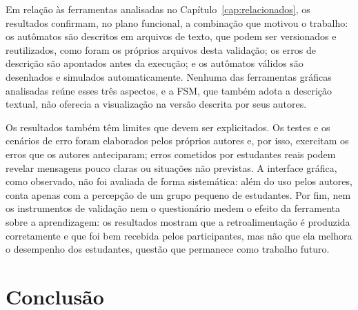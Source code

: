 \documentclass[
    12pt
    ,oneside
    ,a4paper
    ,chapter=TITLE
    ,section=TITLE
    ,sumario=abnt-6027-2012]{abntex2}
\begin{document}
Em relação às ferramentas analisadas no Capítulo~\ref{cap:relacionados}, os resultados
confirmam, no plano funcional, a combinação que motivou o trabalho: os autômatos são
descritos em arquivos de texto, que podem ser versionados e reutilizados, como foram os
próprios arquivos desta validação; os erros de descrição são apontados antes da execução; e
os autômatos válidos são desenhados e simulados automaticamente. Nenhuma das ferramentas
gráficas analisadas reúne esses três aspectos, e a FSM, que também adota a descrição
textual, não oferecia a visualização na versão descrita por seus autores.

Os resultados também têm limites que devem ser explicitados. Os testes e os cenários de erro
foram elaborados pelos próprios autores e, por isso, exercitam os erros que os autores
anteciparam; erros cometidos por estudantes reais podem revelar mensagens pouco claras ou
situações não previstas. A interface gráfica, como observado, não foi avaliada de forma
sistemática: além do uso pelos autores, conta apenas com a percepção de um grupo pequeno de
estudantes. Por fim, nem os instrumentos de validação nem o questionário medem o efeito da
ferramenta sobre a aprendizagem: os resultados mostram que a retroalimentação é produzida
corretamente e que foi bem recebida pelos participantes, mas não que ela melhora o desempenho
dos estudantes, questão que permanece como trabalho futuro.

\chapter{Conclusão}
\label{cap:conclusao}
\end{document}
